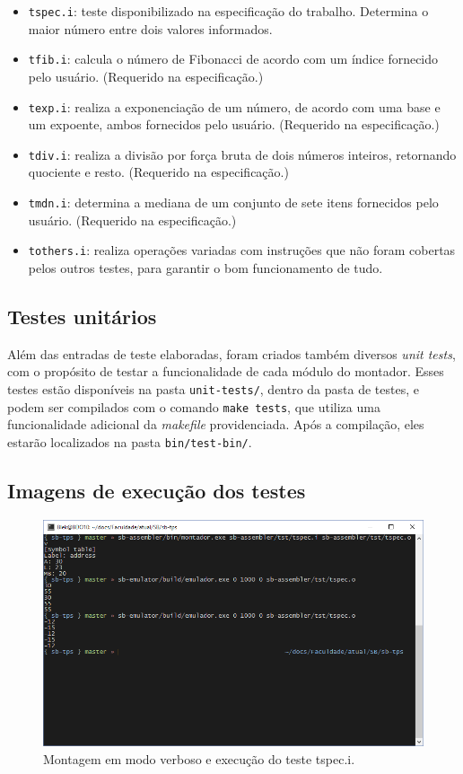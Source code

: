 \documentclass[10pt,a4paper]{article}
\numberwithin{equation}{section}
\begin{document}
\begin{itemize}
    \item \verb|tspec.i|: teste disponibilizado na especificação do trabalho. Determina o maior número entre dois valores informados.
    \item \verb|tfib.i|: calcula o número de Fibonacci de acordo com um índice fornecido pelo usuário. (Requerido na especificação.)
    \item \verb|texp.i|: realiza a exponenciação de um número, de acordo com uma base e um expoente, ambos fornecidos pelo usuário. (Requerido na especificação.)
    \item \verb|tdiv.i|: realiza a divisão por força bruta de dois números inteiros, retornando quociente e resto. (Requerido na especificação.)
    \item \verb|tmdn.i|: determina a mediana de um conjunto de sete itens fornecidos pelo usuário. (Requerido na especificação.)
    \item \verb|tothers.i|: realiza operações variadas com instruções que não foram cobertas pelos outros testes, para garantir o bom funcionamento de tudo.
\end{itemize}

\subsection{Testes unitários}

Além das entradas de teste elaboradas, foram criados também diversos \emph{unit tests}, com o propósito de testar a funcionalidade de cada módulo do montador. Esses testes estão disponíveis na pasta \verb|unit-tests/|, dentro da pasta de testes, e podem ser compilados com o comando \verb|make tests|, que utiliza uma funcionalidade adicional da \emph{makefile} providenciada. Após a compilação, eles estarão localizados na pasta \verb|bin/test-bin/|.

\subsection{Imagens de execução dos testes}

\begin{figure}[h]
    \includegraphics[scale=0.7]{imagens/tspec_console.png}
    \centering
    \caption{Montagem em modo verboso e execução do teste tspec.i.}
\end{figure}
\end{document}
